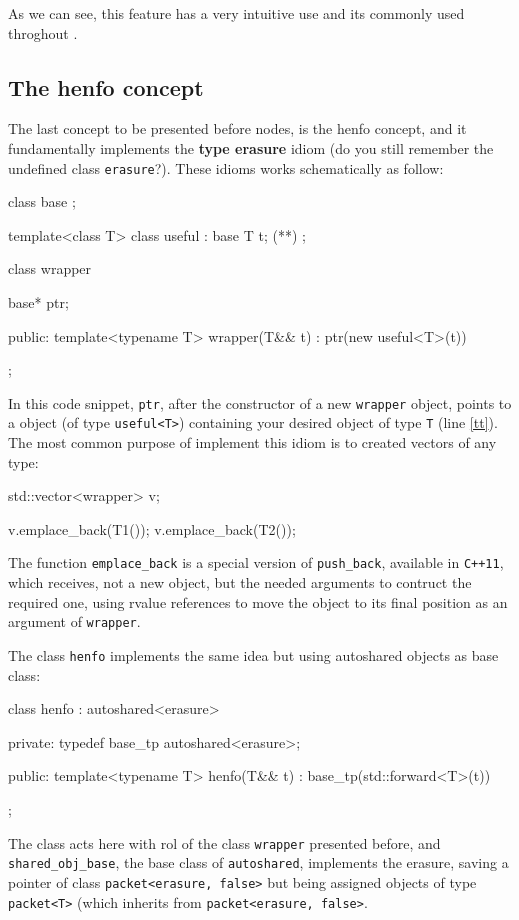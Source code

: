 \documentclass{article}
\begin{document}
As we can see, this feature has a very intuitive use and its commonly used
throghout \fav.

\subsection{The henfo concept}
\label{ssec:henfo}
The last concept to be presented before nodes, is the henfo concept, and it
fundamentally implements the \textbf{type erasure} idiom (do you still remember
the undefined class \texttt{erasure}?). These idioms works schematically as
follow:

\begin{Cpp}
  class base {};

  template<class T>
  class useful : base
  {
     T t; (*\label{tt}*)
  };

  class wrapper
  {
     base* ptr;

  public:
     template<typename T>
     wrapper(T&& t) : ptr(new useful<T>(t))
     {}
  };
\end{Cpp}

In this code snippet, \texttt{ptr}, after the constructor of a new
\texttt{wrapper} object, points to a object (of type \texttt{useful<T>})
containing your desired object of type \texttt{T} (line \ref{tt}). The most
common purpose of implement this idiom is to created vectors of any type:

\begin{Cpp}
  std::vector<wrapper> v;

  v.emplace_back(T1());
  v.emplace_back(T2());
\end{Cpp}

The function \texttt{emplace\_back} is a special version of \texttt{push\_back},
available in \texttt{C++11}, which receives, not a new object, but the needed
arguments to contruct the required one, using rvalue references to move the
object to its final position as an argument of \texttt{wrapper}.

The \fav class \texttt{henfo} implements the same idea but using autoshared
objects as base class:

\begin{Cpp}
  class henfo : autoshared<erasure>
  {
  private:
     typedef base_tp autoshared<erasure>;

  public:
      template<typename T>
      henfo(T&& t)
         : base_tp(std::forward<T>(t))
      {}
  };
\end{Cpp}

The class acts here with rol of the class \texttt{wrapper} presented before, and
\texttt{shared\_obj\_base}, the base class of \texttt{autoshared}, implements
the erasure, saving a pointer of class \texttt{packet<erasure, false>} but being
assigned objects of type \texttt{packet<T>} (which inherits from
\texttt{packet<erasure, false>}.
\end{document}
